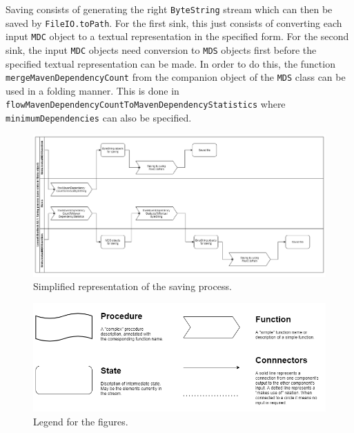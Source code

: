Saving consists of generating the right \texttt{ByteString} stream which can then be saved by \texttt{FileIO.toPath}.
For the first sink, this just consists of converting each input \texttt{MDC} object to a textual representation in the specified form.
For the second sink, the input \texttt{MDC} objects need conversion to \texttt{MDS} objects first before the specified textual representation can be made.
In order to do this, the function \texttt{mergeMavenDependencyCount} from the companion object of the \texttt{MDS} class can be used in a folding manner.
This is done in \texttt{flow\-MavenDependency\-Count\-To\-Maven\-Dependency\-Statistics} where \texttt{minimumDependencies} can also be specified.


\begin{figure}[H]
    \centering
    \includegraphics[width=0.95\linewidth]{images/sinks.png}
    \captionsetup{width=0.7\linewidth}
    \captionsetup{justification=centering}
    \caption{Simplified representation of the saving process. }
    \label{fig:sinks}
\end{figure}

\begin{figure}[H]
    \centering
    \includegraphics[width=0.95\linewidth]{images/legend.png}
    \captionsetup{width=0.7\linewidth}
    \captionsetup{justification=centering}
    \caption{Legend for the figures. }
    \label{fig:legend}
\end{figure}